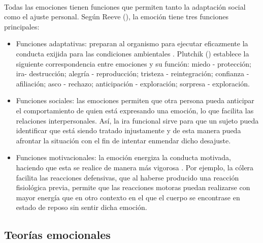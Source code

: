 \paragraph{}
Todas las emociones tienen funciones que permiten tanto la adaptación social como el ajuste personal. Según Reeve (\citeyear{reeve1994motivacion}), la emoción tiene tres funciones principales:
\begin{itemize}
    \item Funciones adaptativas: preparan al organismo para ejecutar eficazmente la conducta exijida para las condiciones ambientales \citep{montanes2005psicologia}. Plutchik (\citeyear{plutchik1980emotion}) establece la siguiente correspondencia entre emociones y su función: miedo - protección; ira- destrucción; alegría - reproducción; tristeza - reintegración; confianza - afiliación; asco - rechazo; anticipación - exploración; sorpresa - exploración. 
    
    \item Funciones sociales: las emociones permiten que otra persona pueda anticipar el comportamiento de quien está expresando una emoción, lo que facilita las relaciones interpersonales. Así, la ira funcional sirve para que un sujeto pueda identificar que está siendo tratado injustamente y de esta manera pueda afrontar la situación con el fin de intentar enmendar dicho desajuste.
    
    \item Funciones motivacionales: la emoción energiza la conducta motivada, haciendo que esta se realice de manera más vigorosa \citep{montanes2005psicologia}. Por ejemplo, la cólera facilita las reacciones defensivas, que al haberse producido una reacción fisiológica previa, permite que las reacciones motoras puedan realizarse con mayor energía que en otro contexto en el que el cuerpo se encontrase en estado de reposo sin sentir dicha emoción.
\end{itemize}


\subsection{Teorías emocionales}
\label{subsec:teorEmoc}
